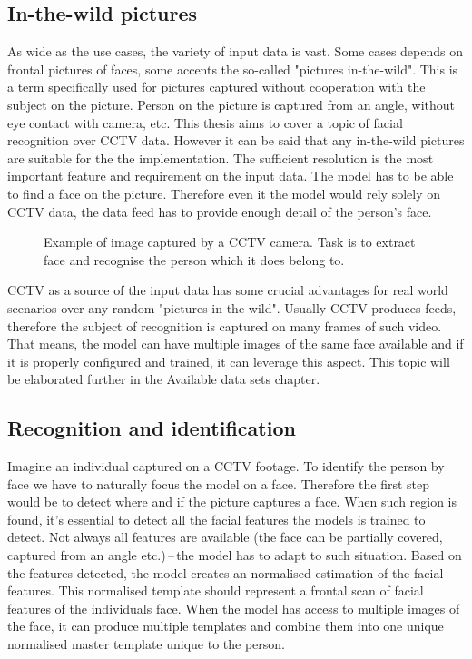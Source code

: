 \subsection{In-the-wild pictures}

As wide as the use cases, the variety of input data is vast. Some cases depends on frontal pictures of faces, some accents the so-called "pictures in-the-wild". This is a term specifically used for pictures captured without cooperation with the subject on the picture. Person on the picture is captured from an angle, without eye contact with camera, etc. This thesis aims to cover a topic of facial recognition over CCTV data. However it can be said that any in-the-wild pictures are suitable for the the implementation. The sufficient resolution is the most important feature and requirement on the input data. The model has to be able to find a face on the picture. Therefore even it the model would rely solely on CCTV data, the data feed has to provide enough detail of the person's face.

\begin{figure}
    \centering
    \caption{Example of image captured by a CCTV camera. Task is to extract face and recognise the person which it does belong to.}
\end{figure}

CCTV as a source of the input data has some crucial advantages for real world scenarios over any random "pictures in-the-wild". Usually CCTV produces feeds, therefore the subject of recognition is captured on many frames of such video. That means, the model can have multiple images of the same face available and if it is properly configured and trained, it can leverage this aspect. This topic will be elaborated further in the Available data sets chapter.

\subsection{Recognition and identification}

Imagine an individual captured on a CCTV footage. To identify the person by face we have to naturally focus the model on a face. Therefore the first step would be to detect where and if the picture captures a face. When such region is found, it's essential to detect all the facial features the models is trained to detect. Not always all features are available (the face can be partially covered, captured from an angle etc.)\,--\,the model has to adapt to such situation. Based on the features detected, the model creates an normalised estimation of the facial features. This normalised template should represent a frontal scan of facial features of the individuals face. When the model has access to multiple images of the face, it can produce multiple templates and combine them into one unique normalised master template unique to the person.


